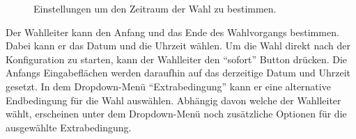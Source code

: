 \documentclass[parskip=full,11pt,twoside]{scrartcl}
\begin{document}
\begin{figure}[H]
	\caption{\label{fig:wlltr-time}
		Einstellungen um den Zeitraum der Wahl zu bestimmen.
	}
\end{figure}
Der \gls{Wahlleiter} kann den Anfang und das Ende des Wahlvorgangs bestimmen. Dabei kann er das Datum und die Uhrzeit wählen. Um die Wahl direkt nach der Konfiguration zu starten, kann der \gls{Wahlleiter} den \enquote{sofort} Button drücken. Die Anfangs Eingabeflächen werden daraufhin auf das derzeitige Datum und Uhrzeit gesetzt.
In dem Dropdown-Menü \enquote{Extrabedingung} kann er eine alternative Endbedingung für die Wahl auswählen.
Abhängig davon welche der \gls{Wahlleiter} wählt, erscheinen unter dem Dropdown-Menü noch zusätzliche Optionen für die ausgewählte Extrabedingung.
\end{document}
